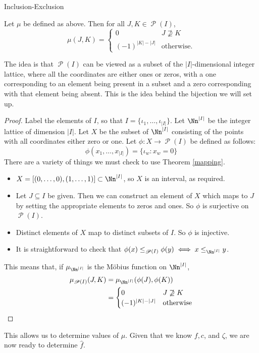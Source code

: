 \documentclass[12pt]{pom_thesis}
\DeclareMathOperator{\ps}{\mathscr{P}}
\begin{document}
\begin{chapter}{Inclusion-Exclusion}
\begin{thm}
Let $\mu$ be defined as above. Then for all $J, K \in \ps(I)$,
\[
\mu(J,K) = 
\begin{cases}
0 & J \not\supseteq K\\
(-1)^{|K|-|J|} & \text{otherwise}.
\end{cases}
\]
\end{thm}
The idea is that $\ps(I)$ can be viewed as a subset of the $|I|$-dimensional integer lattice, where all the coordinates are either ones or zeros, with a one corresponding to an element being present in a subset and a zero corresponding with that element being absent. This is the idea behind the bijection we will set up.
\begin{proof}
Label the elements of $I$, so that $I = \{\iota_1, \dots, \iota_{|I|}\}$. Let $\Nn^{|I|}$ be the integer lattice of dimension $|I|$. Let $X$ be the subset of $\Nn^{|I|}$ consisting of the points with all coordinates either zero or one. Let $\phi:X \rightarrow \ps(I)$ be defined as follows:
\[
\phi(x_1, \dots, x_{|I|}) = \{\iota_w : x_w = 0\}
\]
There are a variety of things we must check to use Theorem \ref{mapping}.
\begin{itemize}
\item $X = [(0,\dots,0), (1,\dots,1)] \subset \Nn^{|I|}$, so $X$ is an interval, as required.
\item Let $J \subseteq I$ be given. Then we can construct an element of $X$ which maps to $J$ by setting the appropriate elements to zeros and ones. So $\phi$ is surjective on $\ps(I)$. 
\item Distinct elements of $X$ map to distinct subsets of $I$. So $\phi$ is injective. 
\item It is straightforward to check that $\phi(x) \leq_{\ps(I)} \phi(y) \iff x \leq_{\Nn^{|I|}} y$.
\end{itemize}
This means that, if $\mu_{\Nn^{|I|}}$ is the M\"obius function on $\Nn^{|I|}$, \begin{align*}
\mu_{\ps(I)}(J,K) &= \mu_{\Nn^{|I|}}(\phi(J), \phi(K)) \\
&= \begin{cases}
0 & J \not\supseteq K\\
(-1)^{|K|-|J|} & \text{otherwise}
\end{cases}
\end{align*}
\end{proof}
This allows us to determine values of $\mu$. Given that we know $f, c$, and $\zeta$, we are now ready to determine $\hat{f}$.


\end{chapter}
\end{document}
